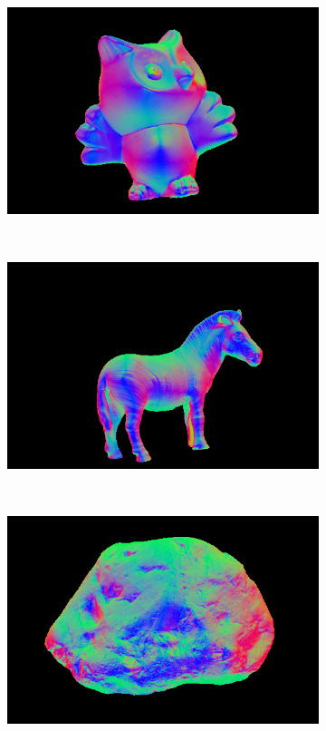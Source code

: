 \documentclass{paper}
\begin{document}
\begin{figure}[h!]
     \begin{subfigure}{0.3\textwidth}
        \includegraphics[width=\textwidth]{results/owl/owl_n}
    \end{subfigure}
    ~
    \begin{subfigure}{0.3\textwidth}
        \includegraphics[width=\textwidth]{results/horse/horse_n}
    \end{subfigure}
    ~
    \begin{subfigure}{0.3\textwidth}
        \includegraphics[width=\textwidth]{results/rock/rock_n}

\end{subfigure}
\end{figure}
\end{document}
